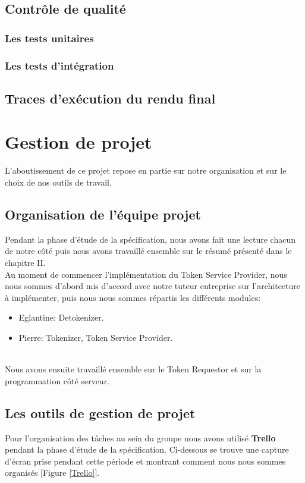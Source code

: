 \documentclass{report}
\begin{document}
\section{Contrôle de qualité}
\subsection{Les tests unitaires}
\subsection{Les tests d'intégration}


\section{Traces d'exécution du rendu final}



\chapter{Gestion de projet}
L'aboutissement de ce projet repose en partie sur notre organisation et sur le choix de nos outils de travail. 

\section{Organisation de l'équipe projet}
Pendant la phase d'étude de la spécification, nous avons fait une lecture chacun de notre côté puis nous avons travaillé ensemble sur le résumé présenté dans le chapitre II.\\
Au moment de commencer l'implémentation du Token Service Provider, nous nous sommes d'abord mis d'accord avec notre tuteur entreprise sur l'architecture à implémenter, puis nous nous sommes répartis les différents modules:\\

\begin{itemize}
	\item Eglantine: Detokenizer.
	\item Pierre: Tokenizer, Token Service Provider.
\end{itemize}

~\\
\noindent
Nous avons ensuite travaillé ensemble sur le Token Requestor et sur la programmation côté serveur.

\section{Les outils de gestion de projet}
Pour l'organisation des tâches au sein du groupe nous avons utilisé \textbf{Trello} pendant la phase d'étude de la spécification. Ci-dessous se trouve une capture d'écran prise pendant cette période et montrant comment nous nous sommes organisés [Figure \ref{Trello}]. 
\end{document}
